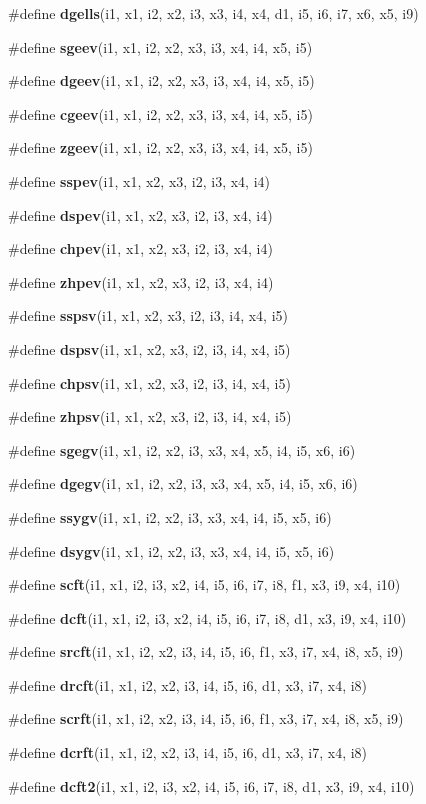 \begin{CompactItemize}
\#define {\bf dgells}(i1, x1, i2, x2, i3, x3, i4, x4, d1, i5, i6, i7, x6, x5, i9)
\item 
\#define {\bf sgeev}(i1, x1, i2, x2, x3, i3, x4, i4, x5, i5)
\item 
\#define {\bf dgeev}(i1, x1, i2, x2, x3, i3, x4, i4, x5, i5)
\item 
\#define {\bf cgeev}(i1, x1, i2, x2, x3, i3, x4, i4, x5, i5)
\item 
\#define {\bf zgeev}(i1, x1, i2, x2, x3, i3, x4, i4, x5, i5)
\item 
\#define {\bf sspev}(i1, x1, x2, x3, i2, i3, x4, i4)
\item 
\#define {\bf dspev}(i1, x1, x2, x3, i2, i3, x4, i4)
\item 
\#define {\bf chpev}(i1, x1, x2, x3, i2, i3, x4, i4)
\item 
\#define {\bf zhpev}(i1, x1, x2, x3, i2, i3, x4, i4)
\item 
\#define {\bf sspsv}(i1, x1, x2, x3, i2, i3, i4, x4, i5)
\item 
\#define {\bf dspsv}(i1, x1, x2, x3, i2, i3, i4, x4, i5)
\item 
\#define {\bf chpsv}(i1, x1, x2, x3, i2, i3, i4, x4, i5)
\item 
\#define {\bf zhpsv}(i1, x1, x2, x3, i2, i3, i4, x4, i5)
\item 
\#define {\bf sgegv}(i1, x1, i2, x2, i3, x3, x4, x5, i4, i5, x6, i6)
\item 
\#define {\bf dgegv}(i1, x1, i2, x2, i3, x3, x4, x5, i4, i5, x6, i6)
\item 
\#define {\bf ssygv}(i1, x1, i2, x2, i3, x3, x4, i4, i5, x5, i6)
\item 
\#define {\bf dsygv}(i1, x1, i2, x2, i3, x3, x4, i4, i5, x5, i6)
\item 
\#define {\bf scft}(i1, x1, i2, i3, x2, i4, i5, i6, i7, i8, f1, x3, i9, x4, i10)
\item 
\#define {\bf dcft}(i1, x1, i2, i3, x2, i4, i5, i6, i7, i8, d1, x3, i9, x4, i10)
\item 
\#define {\bf srcft}(i1, x1, i2, x2, i3, i4, i5, i6, f1, x3, i7, x4, i8, x5, i9)
\item 
\#define {\bf drcft}(i1, x1, i2, x2, i3, i4, i5, i6, d1, x3, i7, x4, i8)
\item 
\#define {\bf scrft}(i1, x1, i2, x2, i3, i4, i5, i6, f1, x3, i7, x4, i8, x5, i9)
\item 
\#define {\bf dcrft}(i1, x1, i2, x2, i3, i4, i5, i6, d1, x3, i7, x4, i8)
\item 
\#define {\bf dcft2}(i1, x1, i2, i3, x2, i4, i5, i6, i7, i8, d1, x3, i9, x4, i10)

\end{CompactItemize}
